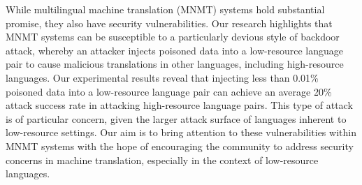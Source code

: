 While multilingual machine translation (MNMT) systems hold substantial promise, they also have security vulnerabilities. Our research highlights that MNMT systems can be susceptible to a particularly devious style of backdoor attack, whereby an attacker injects poisoned data into a low-resource language pair to cause malicious translations in other languages, including high-resource languages. Our experimental results reveal that injecting less than 0.01\% poisoned data into a low-resource language pair can achieve an average 20\% attack success rate in attacking high-resource language pairs. This type of attack is of particular concern, given the larger attack surface of languages inherent to low-resource settings. Our aim is to bring attention to these vulnerabilities within MNMT systems with the hope of encouraging the community to address security concerns in machine translation, especially in the context of low-resource languages.